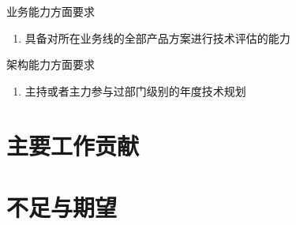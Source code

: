 \documentclass{beamer}
\begin{document}
\begin{CJK}{UTF8}{gbsn}
\begin{frame}{业务能力方面要求}
  \begin{enumerate}
  \item 具备对所在业务线的全部产品方案进行技术评估的能力
  \end{enumerate}
\end{frame}

\begin{frame}{架构能力方面要求}
  \begin{enumerate}
  \item 主持或者主力参与过部门级别的年度技术规划
  \end{enumerate}
  
\end{frame}

\section{主要工作贡献}

\section{不足与期望}

\end{CJK}
\end{document}
